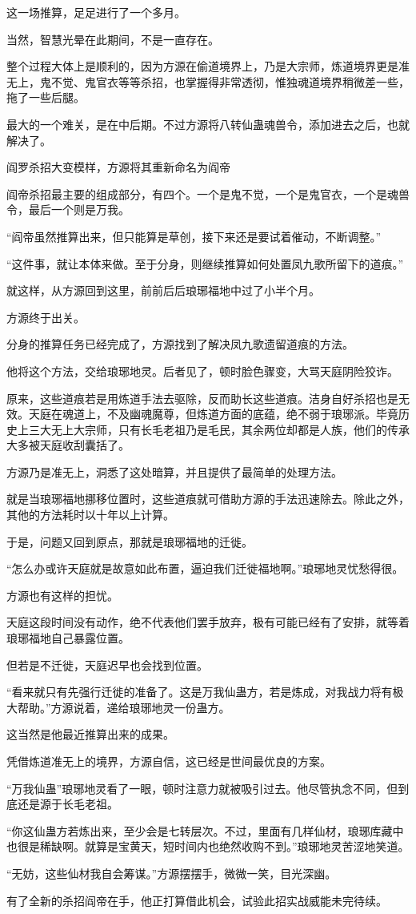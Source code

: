 \begin{this_body}
这一场推算，足足进行了一个多月。

当然，智慧光晕在此期间，不是一直存在。

整个过程大体上是顺利的，因为方源在偷道境界上，乃是大宗师，炼道境界更是准无上，鬼不觉、鬼官衣等等杀招，也掌握得非常透彻，惟独魂道境界稍微差一些，拖了一些后腿。

最大的一个难关，是在中后期。不过方源将八转仙蛊魂兽令，添加进去之后，也就解决了。

阎罗杀招大变模样，方源将其重新命名为阎帝

阎帝杀招最主要的组成部分，有四个。一个是鬼不觉，一个是鬼官衣，一个是魂兽令，最后一个则是万我。

“阎帝虽然推算出来，但只能算是草创，接下来还是要试着催动，不断调整。”

“这件事，就让本体来做。至于分身，则继续推算如何处置凤九歌所留下的道痕。”

就这样，从方源回到这里，前前后后琅琊福地中过了小半个月。

方源终于出关。

分身的推算任务已经完成了，方源找到了解决凤九歌遗留道痕的方法。

他将这个方法，交给琅琊地灵。后者见了，顿时脸色骤变，大骂天庭阴险狡诈。

原来，这些道痕若是用炼道手法去驱除，反而助长这些道痕。洁身自好杀招也是无效。天庭在魂道上，不及幽魂魔尊，但炼道方面的底蕴，绝不弱于琅琊派。毕竟历史上三大无上大宗师，只有长毛老祖乃是毛民，其余两位却都是人族，他们的传承大多被天庭收刮囊括了。

方源乃是准无上，洞悉了这处暗算，并且提供了最简单的处理方法。

就是当琅琊福地挪移位置时，这些道痕就可借助方源的手法迅速除去。除此之外，其他的方法耗时以十年以上计算。

于是，问题又回到原点，那就是琅琊福地的迁徙。

“怎么办或许天庭就是故意如此布置，逼迫我们迁徙福地啊。”琅琊地灵忧愁得很。

方源也有这样的担忧。

天庭这段时间没有动作，绝不代表他们罢手放弃，极有可能已经有了安排，就等着琅琊福地自己暴露位置。

但若是不迁徙，天庭迟早也会找到位置。

“看来就只有先强行迁徙的准备了。这是万我仙蛊方，若是炼成，对我战力将有极大帮助。”方源说着，递给琅琊地灵一份蛊方。

这当然是他最近推算出来的成果。

凭借炼道准无上的境界，方源自信，这已经是世间最优良的方案。

“万我仙蛊”琅琊地灵看了一眼，顿时注意力就被吸引过去。他尽管执念不同，但到底还是源于长毛老祖。

“你这仙蛊方若炼出来，至少会是七转层次。不过，里面有几样仙材，琅琊库藏中也很是稀缺啊。就算是宝黄天，短时间内也绝然收购不到。”琅琊地灵苦涩地笑道。

“无妨，这些仙材我自会筹谋。”方源摆摆手，微微一笑，目光深幽。

有了全新的杀招阎帝在手，他正打算借此机会，试验此招实战威能未完待续。

\end{this_body}

